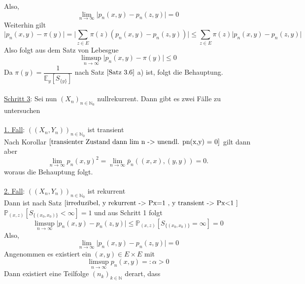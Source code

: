 Also,
\begin{equation*}
\lim_{n \to \infty} \vert p_{n}(x,y) - p_{n}(z,y) \vert = 0
\end{equation*}
Weiterhin gilt
\begin{equation*}
\vert p_{n}(x,y) - \pi(y) \vert = \vert \sum_{z \in E} \pi(z) \left( p_{n}(x,y) - p_{n}(z,y) \right) \vert \leq \sum_{z \in E} \pi(z) \vert  p_{n}(x,y) - p_{n}(z,y)  \vert
\end{equation*}
Also folgt aus dem Satz von Lebesgue
\begin{equation*}
\limsup_{n \to \infty} \vert p_{n}(x,y) - \pi(y) \vert \leq 0
\end{equation*}
Da $\pi(y) = \dfrac{1}{\mathbb{E}_{y}[S_{\lbrace y \rbrace}]}$ nach Satz $\ref{Satz 3.6}$ a) ist, folgt die Behauptung.
\\
\\
\underline{Schritt 3}: Sei nun $(X_{n})_{n \in \mathbb{N}_{0}}$ nullrekurrent. Dann gibt es zwei Fälle zu untersuchen
\\
\\
\underline{1. Fall}: $((X_{n},Y_{n}))_{n \in \mathbb{N}_{0}}$ ist transient
\\
Nach Korollar $\ref{transienter Zustand dann lim n -> unendl. pn(x,y) = 0}$ gilt dann aber
\begin{equation*}
\lim_{n \to \infty} p_{n}(x,y)^{2} = \lim_{n \to \infty} \bar{p}_{n}((x,x),(y,y)) = 0.
\end{equation*}
woraus die Behauptung folgt.
\\
\\
\underline{2. Fall}: $((X_{n},Y_{n}))_{n \in \mathbb{N}_{0}}$ ist rekurrent
\\
Dann ist nach Satz $\ref{irreduzibel, y rekurrent -> Px=1 , y transient -> Px<1 }$ $\mathbb{P}_{(x,z)}[S_{\lbrace (x_{0},x_{0}) \rbrace} < \infty] = 1$ und aus Schritt 1 folgt
\begin{equation*}
\limsup_{n \to \infty} \vert p_{n}(x,y) - p_{n}(z,y) \vert \leq \mathbb{P}_{(x,z)}[S_{\lbrace (x_{0},x_{0}) \rbrace} = \infty] = 0
\end{equation*}
Also,
\begin{equation*}
\lim_{n \to \infty} \vert p_{n}(x,y) - p_{n}(z,y) \vert = 0
\end{equation*}
Angenommen es existiert ein $(x,y) \in E \times E$ mit 
\begin{equation*}
\limsup_{n \to \infty} p_{n}(x,y) =: \alpha > 0
\end{equation*}
Dann existiert eine Teilfolge $(n_{k})_{k \in \mathbb{N}}$ derart, dass
